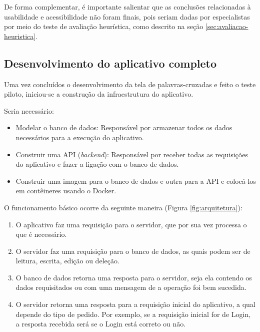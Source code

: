De forma complementar, é importante salientar que as conclusões relacionadas à usabilidade e acessibilidade não foram finais, pois seriam dadas por especialistas por meio do teste de avaliação heurística, como descrito na seção \ref{sec:avaliacao-heuristica}.

\subsection{Desenvolvimento do aplicativo completo}
Uma vez concluídos o desenvolvimento da tela de palavras-cruzadas e feito o teste piloto, iniciou-se a construção da infraestrutura do aplicativo.

Seria necessário:
\begin{itemize}
    \item Modelar o banco de dados: Responsável por armazenar todos os dados necessários para a execução do aplicativo.

    \item Construir uma API (\textit{backend}): Responsável por receber todas as requisições do aplicativo e fazer a ligação com o banco de dados.
    
    \item Construir uma imagem para o banco de dados e outra para a API e colocá-los em contêineres usando o Docker.
\end{itemize}


O funcionamento básico ocorre da seguinte maneira (Figura \ref{fig:arquitetura}):
\begin{enumerate}
    \item O aplicativo faz uma requisição para o servidor, que por sua vez processa o que é necessário.
    
    \item O servidor faz uma requisição para o banco de dados, as quais podem ser de leitura, escrita, edição ou deleção.
    
    \item O banco de dados retorna uma resposta para o servidor, seja ela contendo os dados requisitados ou com uma mensagem de a operação foi bem sucedida.
    
    \item O servidor retorna uma resposta para a requisição inicial do aplicativo, a qual depende do tipo de pedido. Por exemplo, se a requisição inicial for de Login, a resposta recebida será se o Login está correto ou não.
\end{enumerate}


